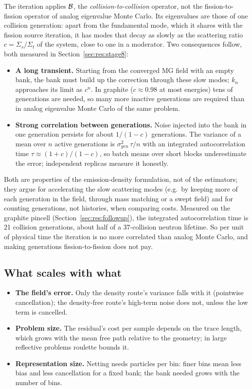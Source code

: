 The iteration applies $\mathcal B$, the \emph{collision-to-collision} operator, not the fission-to-fission
operator of analog eigenvalue Monte Carlo. Its eigenvalues are those of one collision generation:
apart from the fundamental mode, which it shares with the fission source iteration, it has modes that
decay as slowly as the scattering ratio $c=\Sigma_s/\Sigma_t$ of the system, close to one in a
moderator. Two consequences follow, both measured in Section~\ref{sec:res:stage8}:
\begin{itemize}
\item \textbf{A long transient.} Starting from the converged MG field with an empty bank, the bank must
  build up the correction through these slow modes; $k_n$ approaches its limit as $c^n$. In graphite
  ($c\approx0.98$ at most energies) tens of generations are needed, so many more inactive generations
  are required than in analog eigenvalue Monte Carlo of the same problem.
\item \textbf{Strong correlation between generations.} Noise injected into the bank in one generation
  persists for about $1/(1-c)$ generations. The variance of a mean over $n$ active generations is
  $\sigma_{gen}^2\,\tau/n$ with an integrated autocorrelation time $\tau\approx(1+c)/(1-c)$, so batch
  means over short blocks underestimate the error; independent replicas measure it honestly.
\end{itemize}
Both are properties of the emission-density formulation, not of the estimators; they argue for
accelerating the slow scattering modes (e.g.\ by keeping more of each generation in the field, through
mass matching or a swept field) and for counting generations, not histories, when comparing costs. Measured on the graphite pincell (Section~\ref{sec:res:followup}), the integrated
autocorrelation time is 21 collision generations, about half of a 37-collision neutron lifetime. So
per unit of physical time the iteration is no more correlated than analog Monte Carlo, and making
generations fission-to-fission does not pay.

\subsection{What scales with what}

\begin{itemize}
\item \textbf{The field's error.} Only the density route's variance falls with it (pointwise
  cancellation); the density-free route's high-term noise does not, unless the low term is cancelled.
\item \textbf{Problem size.} The residual's cost per sample depends on the trace length, which grows
  with the mean free path relative to the geometry; in large reflective problems roulette bounds it.
\item \textbf{Representation size.} Netting needs particles per bin: finer bins mean less bias and
  less cancellation for a fixed bank; the bank needed grows with the number of bins.
\end{itemize}
